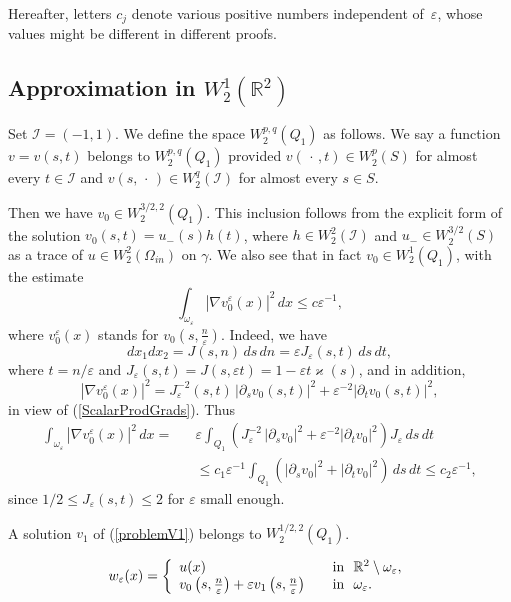 \documentclass[graybox]{svmult}
\renewcommand{\kappa}{\varkappa}
\newcommand{\Real}{\mathbb R}
\newcommand{\eps}{\varepsilon}
\newcommand{\cI}{\mathcal{I}}
\renewcommand{\leq}{\leqslant}
\newcommand\nep{\textstyle\frac n\eps}
\newcommand{\eqref}[1]{(\ref{#1})}
\begin{document}
Hereafter, letters $c_j$ denote various posi\-ti\-ve numbers independent of~$\eps$, whose values might be different in different proofs.




\subsection{Approximation in $W_2^1(\Real^2)$}

Set $\cI=(-1,1)$. We define the space $W_2^{p,q}(Q_1)$ as follows.
We say a function $v=v(s,t)$  belongs to  $W_2^{p,q}(Q_1)$ provided $v(\,\cdot\,,t)\in W_2^p(S)$  for almost every $t\in \cI$ and $v(s, \,\cdot\,)\in W_2^q(\cI)$ for almost every $s\in S$.

Then we have  $v_0\in W_2^{3/2,2}(Q_1)$. This inclusion follows from the explicit form of the solution $v_0(s,t)=u_-(s)h(t)$, where $h\in W_2^2(\cI)$ and $u_-\in W_2^{3/2}(S)$ as a trace of $u\in W_2^2(\Omega_{in})$  on $\gamma$. 
We also see that in fact $v_0\in W_2^1(Q_1)$, with the estimate 
\begin{equation}\label{EstV0inOmegaSmall}
   \int_{\omega_\eps}|\nabla v_0^\eps(x)|^2\,dx\leq c \eps^{-1},
\end{equation}
where $v_0^\eps(x)$ stands for $v_0(s,\nep)$.
Indeed,  we have
$$
dx_1dx_2=J(s,n)\,ds\,dn=\eps J_\eps(s,t)\,ds\,dt,
$$ 
where $t=n/\eps$ and $J_\eps(s,t)=J(s,\eps t)=1-\eps t\kappa(s)$, and in addition,
$$
 |\nabla v_0^\eps(x)|^2=J^{-2}_\eps(s,t)\,|\partial_s v_0(s,t)|^2+
\eps^{-2}|\partial_t v_0(s,t)|^2,
$$
in view of \eqref{ScalarProdGrads}. Thus
\begin{eqnarray}\nonumber
  \int_{\omega_\eps}|\nabla v_0^\eps(x)|^2\,dx
  =&&\eps \int_{Q_1}\left(J^{-2}_\eps\,|\partial_s v_0|^2+
\eps^{-2}|\partial_t v_0|^2\right)J_\eps\,ds\,dt\\\nonumber
 &&\leq c_1\eps^{-1} \int_{Q_1}\left(|\partial_s v_0|^2+
|\partial_t v_0|^2\right)\,ds\,dt \leq  c_2 \eps^{-1},
\end{eqnarray}
since  $1/2\leq J_\eps(s,t) \leq 2$ for $\eps$ small enough.



A solution $v_1$ of  \eqref{problemV1} belongs to $W_2^{1/2,2}(Q_1)$.










\begin{equation}\label{ApproxWe}
w_\eps(x)=
\left\{
  \begin{array}{ll}
    u(x)&\quad \hbox{in \ }\Real^2\setminus \omega_\eps, \\
    v_0\left(s,\nep\right)+\eps v_1\left(s,\nep\right)
&\quad \hbox{in \ } \omega_\eps.
  \end{array}
\right.
\end{equation}
\end{document}
